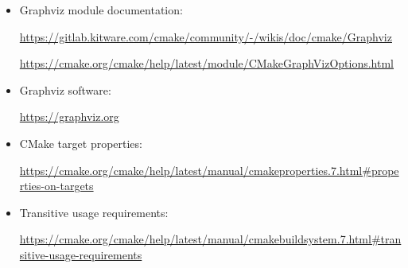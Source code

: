 \begin{itemize}
\item 
Graphviz module documentation:

\url{https://gitlab.kitware.com/cmake/community/-/wikis/doc/cmake/Graphviz}

\url{https://cmake.org/cmake/help/latest/module/CMakeGraphVizOptions.html}
	
\item 
Graphviz software:

\url{https://graphviz.org}
	
\item 
CMake target properties:

\url{https://cmake.org/cmake/help/latest/manual/cmakeproperties.7.html\#properties-on-targets}

\item 
Transitive usage requirements:
 
\url{https://cmake.org/cmake/help/latest/manual/cmakebuildsystem.7.html\#transitive-usage-requirements}
\end{itemize}










